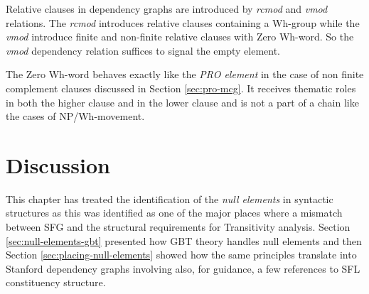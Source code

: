 
Relative clauses in dependency graphs are introduced by \textit{rcmod} and \textit{vmod} relations. The \textit{rcmod} introduces relative clauses containing a Wh-group while the \textit{vmod} introduce finite and non-finite relative clauses with Zero Wh-word. So the \textit{vmod} dependency relation suffices to signal the empty element. 

The Zero Wh-word behaves exactly like the \textit{PRO element} in the case of non finite complement clauses discussed in Section \ref{sec:pro-mcg}. It receives thematic roles in both the higher clause and in the lower clause and is not a part of a chain like the cases of NP/Wh-movement.

\section{Discussion}
This chapter has treated the identification of the \textit{null elements} in syntactic structures as this was identified as one of the major places where a mismatch between SFG and the structural requirements for Transitivity analysis. Section \ref{sec:null-elements-gbt} presented how GBT theory handles null elements and then Section \ref{sec:placing-null-elements} showed how the same principles translate into Stanford dependency graphs involving also, for guidance, a few references to SFL constituency structure.

